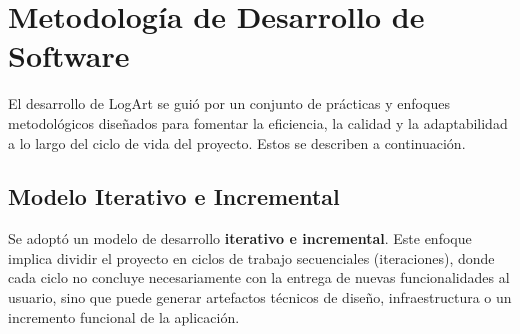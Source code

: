 \section{Metodología de Desarrollo de Software}
\label{sec:metodologiaDesarrollo}

El desarrollo de LogArt se guió por un conjunto de prácticas y enfoques metodológicos diseñados para fomentar la eficiencia, la calidad y la adaptabilidad a lo largo del ciclo de vida del proyecto. Estos se describen a continuación.

\subsection{Modelo Iterativo e Incremental}
\label{sec:modeloIterativoIncremental}

Se adoptó un modelo de desarrollo \textbf{iterativo e incremental}. Este enfoque implica dividir el proyecto en ciclos de trabajo secuenciales (iteraciones), donde cada ciclo no concluye necesariamente con la entrega de nuevas funcionalidades al usuario, sino que puede generar artefactos técnicos de diseño, infraestructura o un incremento funcional de la aplicación.

